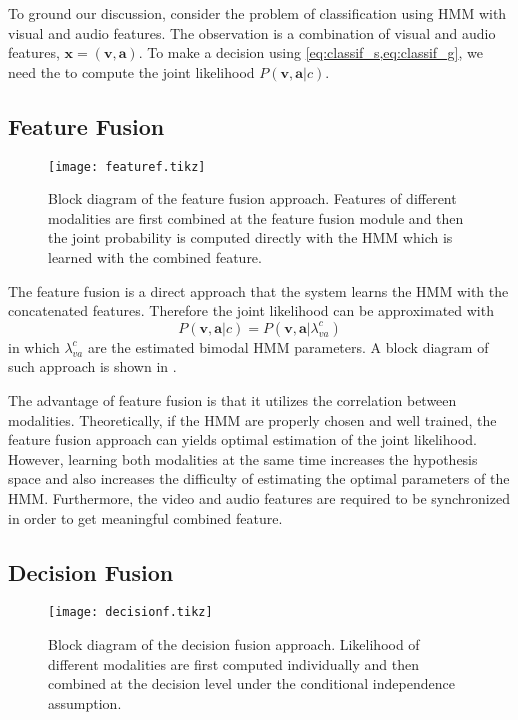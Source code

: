 \documentclass[12pt,final,twoside]{report}
\begin{document}
To ground our discussion, consider the problem of classification using HMM with visual and audio features. The observation is a combination of visual and audio features, $\mathbf{x} = (\mathbf{v}, \mathbf{a})$. To make a decision using \cref{eq:classif_s,eq:classif_g}, we need the to compute the joint likelihood $P(\mathbf{v},\mathbf{a}|c)$.

\subsection{Feature Fusion}
\begin{figure}[t]
  \centering
  \texttt{[image: featuref.tikz]}
  \caption[Block diagram of the feature fusion approach.]{Block diagram of the feature fusion approach. Features of different modalities are first combined at the feature fusion module and then the joint probability is computed directly with the HMM which is learned with the combined feature.}
  \label{fig:featuref}
\end{figure}

The feature fusion is a direct approach that the system learns the HMM with the concatenated features. Therefore the joint likelihood can be approximated with 
\begin{equation}
  P(\mathbf{v},\mathbf{a}|c) = P(\mathbf{v},\mathbf{a}|\lambda_{va}^c)
\end{equation}
in which $\lambda_{va}^c$ are the estimated bimodal HMM parameters. A block diagram of such approach is shown in .

The advantage of feature fusion is that it utilizes the correlation between modalities. Theoretically, if the HMM are properly chosen and well trained, the feature fusion approach can yields optimal estimation of the joint likelihood. However, learning both modalities at the same time increases the hypothesis space and also increases the difficulty of estimating the optimal parameters of the HMM. Furthermore, the video and audio features are required to be synchronized in order to get meaningful combined feature.

\subsection{Decision Fusion}
\begin{figure}[t]
  \centering
  \texttt{[image: decisionf.tikz]}
  \caption[Block diagram of the decision fusion approach.]{Block diagram of the decision fusion approach. Likelihood of different modalities are first computed individually and then combined at the decision level under the conditional independence assumption.}
  \label{fig:decisionf}
\end{figure}
\end{document}

